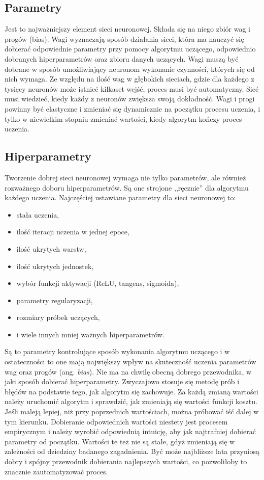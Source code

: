 \documentclass[12pt,a4paper,twoside,titlepage,openright]{book}
\begin{document}
\begin{itemize}
\subsection{Parametry}
Jest to najważniejszy element sieci neuronowej. Składa się na niego zbiór wag i progów (bias). Wagi wyznaczają sposób działania sieci, która ma nauczyć się dobierać odpowiednie parametry przy pomocy algorytmu uczącego, odpowiednio dobranych hiperparametrów oraz zbioru danych uczących. Wagi muszą być dobrane w sposób umożliwiający neuronom wykonanie czynności, których się od nich wymaga. Ze względu na ilość wag w głębokich sieciach, gdzie dla każdego z tysięcy neuronów może istnieć kilkaset wejść, proces musi być automatyczny. Sieć musi wiedzieć, kiedy każdy z neuronów zwiększa swoją dokładność. Wagi i progi powinny być elastyczne i zmieniać się dynamicznie na początku procesu uczenia, i tylko w niewielkim stopniu zmieniać wartości, kiedy algorytm kończy proces uczenia.

\subsection{Hiperparametry}
Tworzenie dobrej sieci neuronowej wymaga nie tylko parametrów, ale również rozważnego doboru hiperparametrów. Są one strojone ,,ręcznie'' dla algorytmu każdego uczenia. Najczęściej ustawiane parametry dla sieci neuronowej to:
\begin{itemize}
\item stała uczenia,
\item ilość iteracji uczenia w jednej epoce,
\item ilość ukrytych warstw,
\item ilość ukrytych jednostek,
\item wybór funkcji aktywacji (ReLU, tangens, sigmoida),
\item parametry regularyzacji,
\item rozmiary próbek uczących,
\item i wiele innych mniej ważnych hiperparametrów.
\end{itemize}

Są to parametry kontrolujące sposób wykonania algorytmu uczącego i w ostateczności to one mają największy wpływ na skuteczność uczenia parametrów wag oraz progów (ang. \textit{bias}). Nie ma na chwilę obecną dobrego przewodnika, w jaki sposób dobierać hiperparametry. Zwyczajowo stosuje się metodę prób i błędów na podstawie tego, jak algorytm się zachowuje. \cite{sitefastAI} Za każdą zmianą wartości należy uruchomić algorytm i sprawdzić, jak zmieniają się wartości funkcji kosztu. Jeśli maleją lepiej, niż przy poprzednich wartościach, można próbować iść dalej w tym kierunku. Dobieranie odpowiednich wartości niestety jest procesem empirycznym i należy wyrobić odpowiednią intuicję, aby jak najtrafniej dobierać parametry od początku. Wartości te też nie są stałe, gdyż zmieniają się w zależności od dziedziny badanego zagadnienia. Być może najbliższe lata przyniosą dobry i spójny przewodnik dobierania najlepszych wartości, co pozwoliłoby to znacznie zautomatyzować proces.


\end{itemize}
\end{document}
